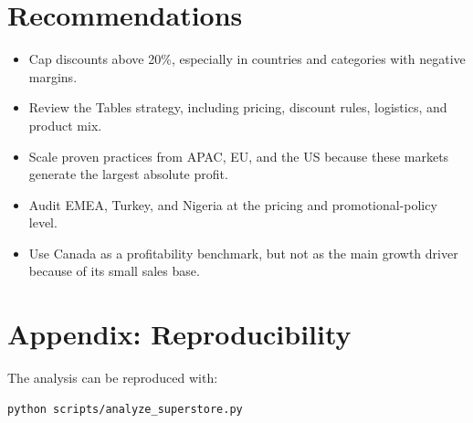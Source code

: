 \documentclass[11pt,a4paper]{article}
\begin{document}
\section{Recommendations}

\begin{itemize}
    \item Cap discounts above 20\%, especially in countries and categories with negative margins.
    \item Review the Tables strategy, including pricing, discount rules, logistics, and product mix.
    \item Scale proven practices from APAC, EU, and the US because these markets generate the largest absolute profit.
    \item Audit EMEA, Turkey, and Nigeria at the pricing and promotional-policy level.
    \item Use Canada as a profitability benchmark, but not as the main growth driver because of its small sales base.
\end{itemize}

\section{Appendix: Reproducibility}

The analysis can be reproduced with:

\begin{verbatim}
python scripts/analyze_superstore.py
\end{verbatim}
\end{document}
